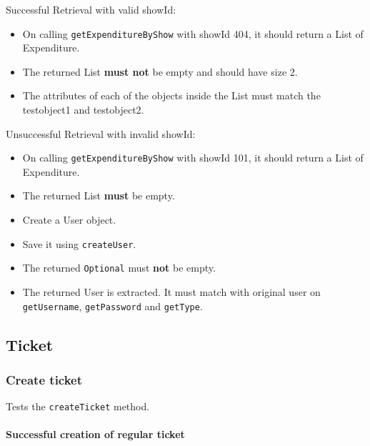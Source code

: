 \documentclass[]{article}
\providecommand{\tightlist}{%
  \setlength{\itemsep}{0pt}\setlength{\parskip}{0pt}}
\let\oldparagraph\paragraph
\renewcommand{\paragraph}[1]{\oldparagraph{#1}\mbox{}}
\begin{document}
Successful Retrieval with valid showId:

\begin{itemize}
\tightlist
\item
  On calling \texttt{getExpenditureByShow} with showId 404, it should
  return a List of Expenditure.
\item
  The returned List \textbf{must not} be empty and should have size 2.
\item
  The attributes of each of the objects inside the List must match the
  testobject1 and testobject2.
\end{itemize}

Unsuccessful Retrieval with invalid showId:

\begin{itemize}
\tightlist
\item
  On calling \texttt{getExpenditureByShow} with showId 101, it should
  return a List of Expenditure.
\item
  The returned List \textbf{must} be empty.
\item
  Create a User object.
\item
  Save it using \texttt{createUser}.
\item
  The returned \texttt{Optional} must \textbf{not} be empty.
\item
  The returned User is extracted. It must match with original user on
  \texttt{getUsername}, \texttt{getPassword} and \texttt{getType}.
\end{itemize}

\hypertarget{ticket}{%
\subsection{Ticket}\label{ticket}}

\hypertarget{create-ticket}{%
\subsubsection{Create ticket}\label{create-ticket}}

Tests the \texttt{createTicket} method.

\hypertarget{successful-creation-of-regular-ticket}{%
\paragraph{Successful creation of regular
ticket}\label{successful-creation-of-regular-ticket}}
\end{document}
